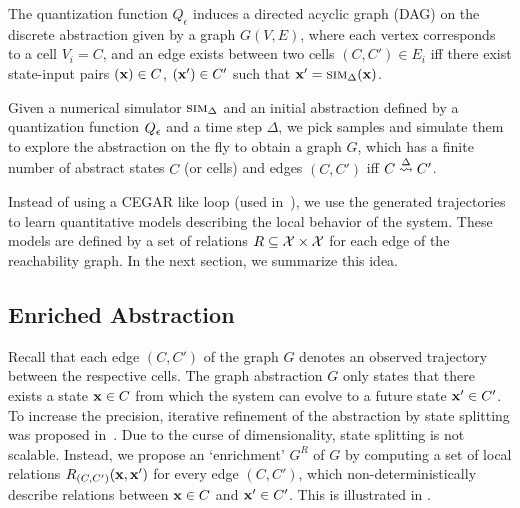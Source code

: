 \begin{definition}
    The quantization function $Q_\epsilon$ induces a directed acyclic
    graph (DAG) on the discrete
    abstraction given by a graph $G(V, E)$, where each vertex
    corresponds to a cell $V_i = C$, and an edge exists between two
    cells $(C, C') \in E_i$ iff there exist state-input pairs
    $(\mathbf{x}) \in C$, $(\mathbf{x}') \in C'$ such that $\mathbf{x}' =
    \mbox{\sc sim}_\Delta(\mathbf{x})$.
\end{definition}



Given a numerical simulator $\mbox{\sc sim}_\Delta$ and an initial abstraction
defined by a quantization function $Q_\epsilon$ and a time step
$\Delta$, we pick samples and simulate them to explore the abstraction
on the fly to obtain a graph $G$, which has a finite number of
abstract states $C$ (or cells) and edges $(C,C')$ iff $C
\overset{\Delta}{\rightsquigarrow} C'$.



Instead of using a CEGAR like loop (used in~\cite{zutshi2014multiple}),
we use the generated trajectories to learn quantitative models
describing the local behavior of the system. These models are defined
by a set of relations $R \subseteq \mathcal{X} \times \mathcal{X}$
for each edge of the reachability graph. In the next section, we
summarize this idea.


\subsection{Enriched Abstraction}



Recall that each edge $(C,C')$ of the graph $G$ denotes an observed
trajectory between the respective cells. The graph abstraction $G$
only states that there exists a state $\mathbf{x} \in C$ from which the system
can evolve to a future state $\mathbf{x}' \in C'$. To increase the precision,
iterative refinement of the abstraction by state splitting was
proposed in~\cite{zutshi2014multiple}. Due to the curse of
dimensionality, state splitting is not scalable. Instead, we propose
an `enrichment' $G^R$ of $G$ by computing a set of local relations
$R_{(C,C')}(\mathbf{x},\mathbf{x}')$ for every edge $(C,C')$, which
non-deterministically describe relations between $\mathbf{x} \in C$ and $\mathbf{x}'
\in C'$. This is illustrated in .

